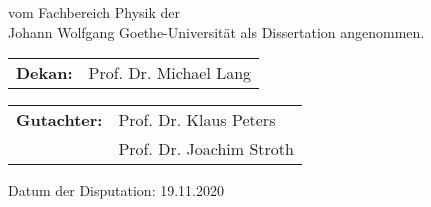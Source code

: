 \begin{titlepage}
\thispagestyle{empty}

\vspace*{0.5\textheight}

\noindent{}%
vom Fachbereich Physik der \\[2pt]
Johann Wolfgang Goethe-Universit\"at als Dissertation angenommen.

\vspace*{2cm}

\noindent{}%
\begin{tabular}{@{}l@{\hskip 1ex}l}
  \bf{Dekan}: & Prof. Dr. Michael Lang
\end{tabular}

\vspace*{1cm}

\noindent{}%
\begin{tabular}{@{}l@{\hskip 1ex}l}
    \bf{Gutachter}: & Prof. Dr. Klaus Peters\\
                    & Prof. Dr. Joachim Stroth
\end{tabular}

\vspace*{2cm}
\noindent{}%
Datum der Disputation: 19.11.2020
\end{titlepage}